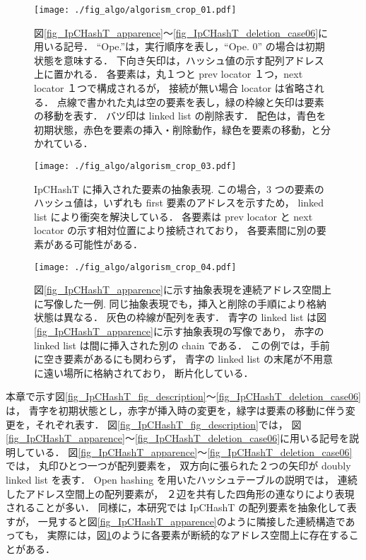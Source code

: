 \begin{figure}
  \texttt{[image: ./fig\_algo/algorism\_crop\_01.pdf]}
  \caption{
    図\ref{fig_IpCHashT_apparence}〜\ref{fig_IpCHashT_deletion_case06}に用いる記号．
    ``Ope.''は，実行順序を表し，``Ope. 0'' の場合は初期状態を意味する．
    下向き矢印は，ハッシュ値の示す配列アドレス上に置かれる．
    各要素は，丸１つと prev locator １つ，next locator １つで構成されるが，
    接続が無い場合 locator は省略される．
    点線で書かれた丸は空の要素を表し，緑の枠線と矢印は要素の移動を表す．
    バツ印は linked list の削除表す．
    配色は，青色を初期状態，赤色を要素の挿入・削除動作，緑色を要素の移動，と分かれている．
  }
  \label{fig_IpCHashT_fig_description}

  \texttt{[image: ./fig\_algo/algorism\_crop\_03.pdf]}
  \caption{
    IpCHashT に挿入された要素の抽象表現.
    この場合，3 つの要素のハッシュ値は，いずれも first 要素のアドレスを示すため，
    linked list により衝突を解決している．
    各要素は prev locator と next locator の示す相対位置により接続されており，
    各要素間に別の要素がある可能性がある．
  }
  \label{fig_IpCHashT_apparence}

  \texttt{[image: ./fig\_algo/algorism\_crop\_04.pdf]}
  \caption{
    図\ref{fig_IpCHashT_apparence}に示す抽象表現を連続アドレス空間上に写像した一例.
    同じ抽象表現でも，挿入と削除の手順により格納状態は異なる．
    灰色の枠線が配列を表す．
    青字の linked list は図\ref{fig_IpCHashT_apparence}に示す抽象表現の写像であり，
    赤字の linked list は間に挿入された別の chain である．
    この例では，手前に空き要素があるにも関わらず，
    青字の linked list の末尾が不用意に遠い場所に格納されており，
    断片化している．
  }
  \label{fig_IpCHashT_insert_introspection}
\end{figure}

本章で示す図\ref{fig_IpCHashT_fig_description}〜\ref{fig_IpCHashT_deletion_case06}は，
青字を初期状態とし，赤字が挿入時の変更を，緑字は要素の移動に伴う変更を，それぞれ表す．
図\ref{fig_IpCHashT_fig_description}では，
図\ref{fig_IpCHashT_apparence}〜\ref{fig_IpCHashT_deletion_case06}に用いる記号を説明している．
図\ref{fig_IpCHashT_apparence}〜\ref{fig_IpCHashT_deletion_case06}では，
丸印ひとつ一つが配列要素を，
双方向に張られた２つの矢印が doubly linked list を表す．
Open hashing を用いたハッシュテーブルの説明では，
連続したアドレス空間上の配列要素が，
２辺を共有した四角形の連なりにより表現されることが多い．
同様に，本研究では IpCHashT の配列要素を抽象化して表すが，
一見すると図\ref{fig_IpCHashT_apparence}のように隣接した連続構造であっても，
実際には，図\ref{fig_IpCHashT_insert_introspection}のように各要素が断続的なアドレス空間上に存在することがある．

